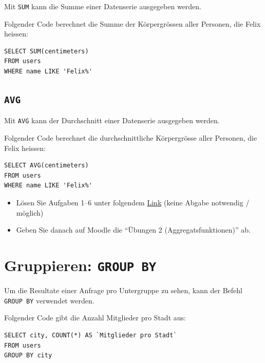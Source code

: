 Mit \lstinline|SUM| kann die Summe einer Datenserie ausgegeben werden.

\begin{myexample}
Folgender Code berechnet die Summe der Körpergrössen aller Personen, die Felix heissen:

\begin{lstlisting}
SELECT SUM(centimeters)
FROM users
WHERE name LIKE 'Felix%'
\end{lstlisting}
\end{myexample}

\subsection{\texorpdfstring{\lstinline|AVG|}{AVG}}

Mit \lstinline|AVG| kann der Durchschnitt einer Datenserie ausgegeben werden.

\begin{myexample}
Folgender Code berechnet die durchschnittliche Körpergrösse aller Personen, die Felix heissen:

\begin{lstlisting}
SELECT AVG(centimeters)
FROM users
WHERE name LIKE 'Felix%'
\end{lstlisting}
\end{myexample}

\begin{myexercise}
  \begin{itemize}
    \item Lösen Sie Aufgaben 1--6 unter folgendem \href{https://sql-tutorial.de/home/uebungen.php?lektion=2}{Link} (keine Abgabe notwendig / möglich)
    \item Geben Sie danach auf Moodle die \enquote{Übungen 2 (Aggregatsfunktionen)} ab.
  \end{itemize}
\end{myexercise}

\section{Gruppieren: \texorpdfstring{\lstinline|GROUP BY|}{GROUP BY}}
Um die Resultate einer Anfrage pro Untergruppe zu sehen, kann der Befehl \lstinline|GROUP BY| verwendet werden.

\begin{myexample}
Folgender Code gibt die Anzahl Mitglieder pro Stadt aus:
\begin{lstlisting}
SELECT city, COUNT(*) AS `Mitglieder pro Stadt`
FROM users
GROUP BY city
\end{lstlisting}
\end{myexample}

